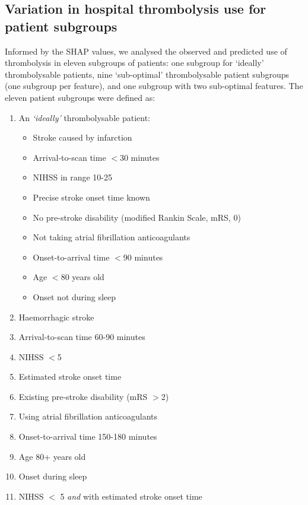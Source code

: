 

\subsection{Variation in hospital thrombolysis use for patient subgroups}

Informed by the SHAP values, we analysed the observed and predicted use of thrombolysis in eleven subgroups of patients: one subgroup for `ideally' thrombolysable patients, nine `sub-optimal' thrombolysable patient subgroups (one subgroup per feature), and one subgroup with two sub-optimal features. The eleven patient subgroups were defined as:

\begin{enumerate}
  \item An \emph{`ideally'} thrombolysable patient:
  \begin{itemize}
    \setlength\itemsep{-2mm}
    \item Stroke caused by infarction
    \item Arrival-to-scan time $<$30 minutes
    \item NIHSS in range 10-25
    \item Precise stroke onset time known
    \item No pre-stroke disability (modified Rankin Scale, mRS, 0)
    \item Not taking atrial fibrillation anticoagulants
    \item Onset-to-arrival time $<$90 minutes
    \item Age $<$80 years old
    \item Onset not during sleep
  \end{itemize}
  \item Haemorrhagic stroke
  \item Arrival-to-scan time 60-90 minutes
  \item NIHSS $<$5
  \item Estimated stroke onset time
  \item Existing pre-stroke disability (mRS $>$2)
  \item Using atrial fibrillation anticoagulants
  \item Onset-to-arrival time 150-180 minutes
  \item Age 80+ years old
  \item Onset during sleep
  \item NIHSS $<$ 5 \emph{and} with estimated stroke onset time
\end{enumerate}

